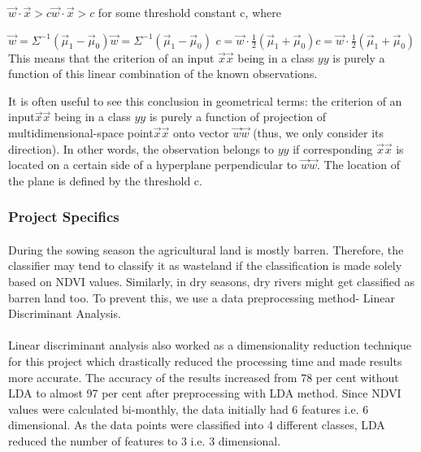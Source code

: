 \documentclass[12pt, a4paper]{report}
\begin{document}
${\displaystyle {\vec {w}}\cdot {\vec {x}}>c}{\vec {w}}\cdot {\vec {x}}>c$
for some threshold constant c, where

${\displaystyle {\vec {w}}=\Sigma ^{-1}({\vec {\mu }}_{1}-{\vec {\mu }}_{0})}{\vec {w}}=\Sigma ^{-1}({\vec {\mu }}_{1}-{\vec {\mu }}_{0})$
${\displaystyle c={\vec {w}}\cdot {\frac {1}{2}}({\vec {\mu }}_{1}+{\vec {\mu }}_{0})}{\displaystyle c={\vec {w}}\cdot {\frac {1}{2}}({\vec {\mu }}_{1}+{\vec {\mu }}_{0})}$
This means that the criterion of an input ${\displaystyle {\vec {x}}}{\displaystyle {\vec {x}}}$ being in a class ${\displaystyle y}y$ is purely a function of this linear combination of the known observations.

It is often useful to see this conclusion in geometrical terms: the criterion of an input$ {\displaystyle {\vec {x}}}{\displaystyle {\vec {x}}}$ being in a class ${\displaystyle y}y$ is purely a function of projection of multidimensional-space point$ {\displaystyle {\vec {x}}}{\displaystyle {\vec {x}}}$ onto vector ${\displaystyle {\vec {w}}}{\displaystyle {\vec {w}}}$ (thus, we only consider its direction). In other words, the observation belongs to ${\displaystyle y}y$ if corresponding ${\displaystyle {\vec {x}}}{\displaystyle {\vec {x}}}$ is located on a certain side of a hyperplane perpendicular to ${\displaystyle {\vec {w}}}{\displaystyle {\vec {w}}}$. The location of the plane is defined by the threshold c.

\subsubsection{Project Specifics}
\paragraph{}
 During the sowing season the agricultural land is mostly barren. Therefore, the classifier may tend to classify it as wasteland if the classification is made solely based on NDVI values. Similarly, in dry seasons, dry rivers might get classified as barren land too. To prevent this, we use a data preprocessing method- Linear Discriminant Analysis.
\paragraph{}
Linear discriminant analysis also worked as a dimensionality reduction technique for this project which drastically reduced the processing time and made results more accurate. The accuracy of the results increased from 78 per cent without LDA to almost 97 per cent after preprocessing with LDA method. Since NDVI values were calculated bi-monthly, the data initially had 6 features i.e. 6 dimensional. As the data points were classified into 4 different classes, LDA reduced the number of features to 3 i.e. 3 dimensional.
\end{document}
